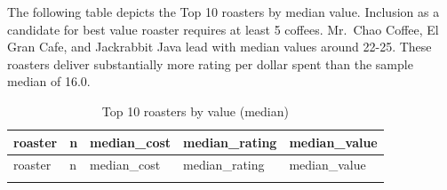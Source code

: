 \documentclass[11pt,preprint]{elsarticle}
\numberwithin{equation}{section}
\numberwithin{figure}{section}
\numberwithin{table}{section}
\begin{document}
The following table depicts the Top 10 roasters by median value.
Inclusion as a candidate for best value roaster requires at least 5
coffees. Mr.~Chao Coffee, El Gran Cafe, and Jackrabbit Java lead with
median values around 22-25. These roasters deliver substantially more
rating per dollar spent than the sample median of 16.0.

\begin{longtable}[]{@{}
  >{\raggedright\arraybackslash}p{}
  >{\raggedleft\arraybackslash}p{}
  >{\raggedleft\arraybackslash}p{}
  >{\raggedleft\arraybackslash}p{}
  >{\raggedleft\arraybackslash}p{}@{}}
\caption{Top 10 roasters by value (median)}\tabularnewline
\toprule\noalign{}
\begin{minipage}[b]{\linewidth}\raggedright
roaster
\end{minipage} & \begin{minipage}[b]{\linewidth}\raggedleft
n
\end{minipage} & \begin{minipage}[b]{\linewidth}\raggedleft
median\_cost
\end{minipage} & \begin{minipage}[b]{\linewidth}\raggedleft
median\_rating
\end{minipage} & \begin{minipage}[b]{\linewidth}\raggedleft
median\_value
\end{minipage} \\
\midrule\noalign{}
\endfirsthead
\toprule\noalign{}
\begin{minipage}[b]{\linewidth}\raggedright
roaster
\end{minipage} & \begin{minipage}[b]{\linewidth}\raggedleft
n
\end{minipage} & \begin{minipage}[b]{\linewidth}\raggedleft
median\_cost
\end{minipage} & \begin{minipage}[b]{\linewidth}\raggedleft
median\_rating
\end{minipage} & \begin{minipage}[b]{\linewidth}\raggedleft
median\_value
\end{minipage} \\
\midrule\noalign{}
\endhead
\bottomrule\noalign{}
\endlastfoot

\end{longtable}
\end{document}
